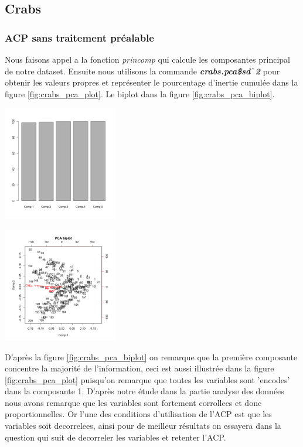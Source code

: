 \documentclass[10pt]{article}
\begin{document}
\subsection{Crabs}
\subsubsection{ACP sans traitement préalable}
	Nous faisons appel a la fonction \textit{princomp }qui calcule les composantes principal de notre dataset. Ensuite nous utilisons la commande  \textit{\textbf{crabs.pca\$sd$\string^$2}}   pour obtenir les valeurs propres et représenter le pourcentage d'inertie cumulée dans la figure \ref{fig:crabs_pca_plot}. Le biplot dans la figure \ref{fig:crabs_pca_biplot}.\\
	\begin{minipage}{.5\textwidth}
		\centering
		\includegraphics[width=50mm]{Figures/Crabs/pca_plot.png}
		\label{fig:crabs_pca_plot}
	\end{minipage}%
	\hspace{0.08\linewidth}
	\begin{minipage}{.5\textwidth}
		\centering
		\includegraphics[width=50mm]{Figures/Crabs/pca_biplot.png}
		\label{fig:crabs_pca_biplot}
	\end{minipage}
	\vspace{2mm}
	
	D'après la figure \ref{fig:crabs_pca_biplot} on remarque que la première composante concentre la majorité de l'information, ceci est aussi illustrée dans la figure \ref{fig:crabs_pca_plot} puisqu'on remarque que toutes les variables sont 'encodes' dans la composante 1. D'après notre étude dans la partie analyse des données nous avons remarque que les variables sont fortement corrollees et donc proportionnelles. Or l'une des conditions d'utilisation de l'ACP est que les variables soit decorrelees, ainsi pour de meilleur résultats on essayera dans la question qui suit de decorreler les variables et retenter l'ACP.
	
\end{document}
